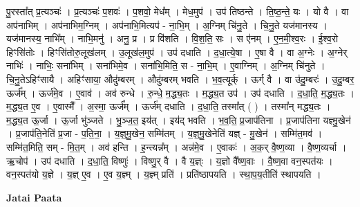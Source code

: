 \documentclass[17pt]{extarticle}
\begin{document}
पु॒रस्ता᳚त् प्र॒त्यञ्चः॑ । प्र॒त्यञ्चः॑ प॒शवः॑ । प॒शवो॒ मेध᳚म् । मेध॒मुप॑ । उप॑ तिष्ठन्ते । ति॒ष्ठ॒न्ते॒ यः । यो वै । वा अप॑नाभिम् । अप॑नाभिम॒ग्निम् । अप॑नाभि॒मित्यप॑ - ना॒भि॒म् । अ॒ग्निम् चि॑नु॒ते । चि॒नु॒ते यज॑मानस्य । यज॑मानस्य॒ नाभि᳚म् । नाभि॒मनु॑ । अनु॒ प्र । प्र वि॑शति । वि॒श॒ति॒ सः । स ए॑नम् । ए॒न॒मी॒श्व॒रः । ई॒श्व॒रो हिꣳसि॑तोः । हिꣳसि॑तोरु॒लूख॑लम् । उ॒लूख॑ल॒मुप॑ । उप॑ दधाति । द॒धा॒त्ये॒षा । ए॒षा वै । वा अ॒ग्नेः । अ॒ग्नेर् नाभिः॑ । नाभिः॒ सना॑भिम् । सना॑भिमे॒व । सना॑भि॒मिति॒ स - ना॒भि॒म् । ए॒वाग्निम् । अ॒ग्निम् चि॑नुते । चि॒नु॒तेऽहिꣳ॑सायै । अहिꣳ॑साया॒ औदु॑म्बरम् । औदु॑म्बरम् भवति । भ॒व॒त्यूर्क् । ऊर्ग् वै । वा उ॑दु॒म्बरः॑ । उ॒दु॒म्बर॒ ऊर्ज᳚म् । ऊर्ज॑मे॒व । ए॒वाव॑ । अव॑ रुन्धे । रु॒न्धे॒ म॒द्ध्य॒तः । म॒द्ध्य॒त उप॑ । उप॑ दधाति । द॒धा॒ति॒ म॒द्ध्य॒तः । म॒द्ध्य॒त ए॒व । ए॒वास्मै᳚ । अ॒स्मा॒ ऊर्ज᳚म् । ऊर्ज॑म् दधाति । द॒धा॒ति॒ तस्मा᳚त् ( ) । तस्मा᳚न् मद्ध्य॒तः । म॒द्ध्य॒त ऊ॒र्जा । ऊ॒र्जा भु॑ञ्जते । भु॒ञ्ज॒त॒ इय॑त् । इय॑द् भवति । भ॒व॒ति॒ प्र॒जाप॑तिना । प्र॒जाप॑तिना यज्ञ्मु॒खेन॑ । प्र॒जाप॑ति॒नेति॑ प्र॒जा - प॒ति॒ना॒ । य॒ज्ञ्॒मु॒खेन॒ सम्मि॑तम् । य॒ज्ञ्॒मु॒खेनेति॑ यज्ञ् - मु॒खेन॑ । सम्मि॑त॒मव॑ । सम्मि॑त॒मिति॒ सम् - मि॒त॒म् । अव॑ हन्ति । ह॒न्त्यन्न᳚म् । अन्न॑मे॒व । ए॒वाकः॑ । अ॒क॒र् वै॒ष्ण॒व्या । वै॒ष्ण॒व्यर्चा । ऋ॒चोप॑ । उप॑ दधाति । द॒धा॒ति॒ विष्णुः॑ । विष्णु॒र् वै । वै य॒ज्ञ्ः । य॒ज्ञो वै᳚ष्ण॒वाः । वै॒ष्ण॒वा वन॒स्पत॑यः । वन॒स्पत॑यो य॒ज्ञे । य॒ज्ञ् ए॒व । ए॒व य॒ज्ञ्म् । य॒ज्ञ्म् प्रति॑ । प्रति॑ष्ठापयति । स्था॒प॒य॒तीति॑ स्थापयति । \newline

\textbf{Jatai Paata} \newline
\end{document}
